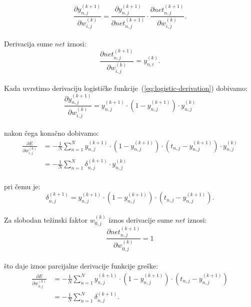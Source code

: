 \begin{equation*}
    \frac{\partial y_{n, j}^{(k + 1)}}{\partial w_{i, j}^{(k)}} =
    \frac{\partial y_{n, j}^{(k + 1)}}{\partial net_{n, j}^{(k + 1)}} \cdot
    \frac{\partial net_{n, j}^{(k + 1)}}{\partial w_{i, j}^{(k)}}.
\end{equation*}\\
Derivacija sume $net$ iznosi:\\
\begin{equation*}
    \frac{\partial net_{n, j}^{(k + 1)}}{\partial w_{i, j}^{(k)}} = y_{n, i}^{(k)}.
\end{equation*}\\
Kada uvrstimo derivaciju logističke funkcije\ (\ref{eq:logistic-derivation}) dobivamo:\\
\begin{equation*}
    \frac{\partial y_{n, j}^{(k + 1)}}{\partial w_{i, j}^{(k)}} = y_{n, j}^{(k + 1)} \cdot
    \left(1 - y_{n, j}^{(k + 1)}\right) \cdot y_{n, j}^{(k)}
\end{equation*}\\
nakon čega konačno dobivamo:\\
\begin{align*}
    \frac{\partial E}{\partial w_{i, j}^{(k)}} & = -\frac{1}{N} \sum_{n = 1}^{N} y_{n, j}^{(k + 1)} \cdot
    \left(1 - y_{n, j}^{(k + 1)}\right) \cdot \left(t_{n, j} - y_{n, j}^{(k + 1)}\right) \cdot y_{n, j}^{(k)}\\
    & = -\frac{1}{N} \sum_{n = 1}^{N} \delta_{n, j}^{(k + 1)} \cdot y_{n, j}^{(k)}
\end{align*}\\
pri čemu je:\\
\begin{equation*}
    \delta_{n, j}^{(k + 1)} = y_{n, j}^{(k + 1)} \cdot \left(1 - y_{n, j}^{(k + 1)}\right) \cdot
    \left(t_{n, j} - y_{n, j}^{(k + 1)}\right).
\end{equation*}\\
Za slobodan težinski faktor $w_{0, j}^{(k)}$ iznos derivacije sume $net$ iznosi:
\begin{equation*}
    \frac{\partial net_{n, j}^{(k + 1)}}{\partial w_{0, j}^{(k)}} = 1
\end{equation*}\\
što daje iznos parcijalne derivacije funkcije greške:\\
\begin{align*}
    \frac{\partial E}{\partial w_{0, j}^{(k)}} & = -\frac{1}{N} \sum_{n = 1}^{N} y_{n, j}^{(k + 1)} \cdot
    \left(1 - y_{n, j}^{(k + 1)}\right) \cdot \left(t_{n, j} - y_{n, j}^{(k + 1)}\right)\\
    & = -\frac{1}{N} \sum_{n = 1}^{N} \delta_{n, j}^{(k + 1)}.
\end{align*}


